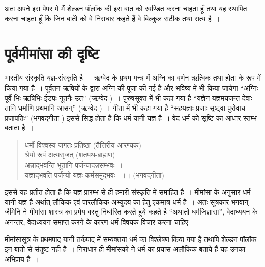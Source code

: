 अतः अपने इस पेपर मे मैं शेल्डन पॉलॉक की इस बात को रवण्डित करना चाहता हूँ तथा यह स्थापित करना चाहता हूँ कि जिन बातोें को वे निराधार कहते हैं वे बिल्कुल सटीक तथा सत्य है~।


\section*{पूर्वमीमांसा की दृष्टि}

भारतीय संस्कृति यज्ञ-संस्कृति है~। ऋग्वेद के प्रथम मन्त्र में अग्नि का वर्णन ऋत्विक तथा होता के रूप में किया गया है~। पूर्वतन ऋषियों के द्वारा अग्नि की पूजा की गई है और भविष्य में भी किया जायेगा “अग्निः पूर्वे भिः ऋषिभिः ईड्यः नूतनैः उत” (ऋग्वेद )~। पुरुषसूक्त में भी कहा गया है “यज्ञेन यज्ञमयजन्त देवाः तानि धर्माणि प्रथमानि आसन्” (ऋग्वेद )~। गीता में भी कहा गया है “सहयज्ञाः प्रजाः सृष्ट्वा पुरोवाच प्रजापतिः” (भगवद्गीता ) इससे सिद्ध होता है कि धर्म यानी यज्ञ है~। वेद धर्म को सृष्टि का आधार स्तम्भ बताता है~।

\begin{verse}
धर्मो विश्वस्य जगतः प्रतिष्ठा (तैत्तिरीय-आरण्यक)\\ श्रेयो रूपं अत्यसृजत् (शतपथ-ब्राह्मण)\\अन्नाद्भवन्ति भूतानि पर्जन्यादन्नसम्भवः~।\\यज्ञाद्भवति पर्जन्यो यज्ञः कर्मसमुद्भवः ~।। (भगवद्गीता)
\end{verse}

इससे यह प्रतीत होता है कि यज्ञ प्रारम्भ से ही हमारी संस्कृति में समाहित है~। मीमांसा के अनुसार धर्म यानी यज्ञ है अर्थात् लौकिक एवं पारलौकिक अभ्युदय का हेतु एकमात्र धर्म है~। अतः सूत्रकार भगवान् जैमिनि ने मीमांसा शास्त्र का प्रमेय वस्तु निर्धारित करते हुये कहते है “अथातो धर्मजिज्ञासा”, वेदाध्ययन के अनन्तर, वेदाध्ययन समाप्त करने के कारण धर्म-विषयक विचार करना चाहिए~।

मीमांसासूत्र के प्रथमपाद यानी तर्कपाद में सम्यक्तया धर्म का विश्लेषण किया गया है तथापि शेल्डन पॉलॉक इन बातो से संतुष्ट नही है~। निराधार ही मीमांसको ने धर्म का प्रयास अलौकिक बताये हैं यह उनका अभिप्राय है~।

\begin{myquote}

~\hfill {}
\end{myquote}

